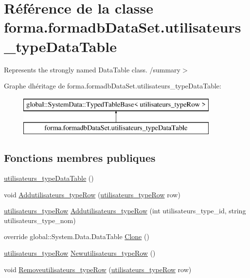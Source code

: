 \hypertarget{classforma_1_1formadb_data_set_1_1utilisateurs__type_data_table}{}\section{Référence de la classe forma.\+formadb\+Data\+Set.\+utilisateurs\+\_\+type\+Data\+Table}
\label{classforma_1_1formadb_data_set_1_1utilisateurs__type_data_table}


Represents the strongly named Data\+Table class. /summary$>$  


Graphe d\textquotesingle{}héritage de forma.\+formadb\+Data\+Set.\+utilisateurs\+\_\+type\+Data\+Table\+:\begin{figure}[H]
\begin{center}
\leavevmode
\includegraphics[height=2.000000cm]{classforma_1_1formadb_data_set_1_1utilisateurs__type_data_table}
\end{center}
\end{figure}
\subsection*{Fonctions membres publiques}
\begin{DoxyCompactItemize}
\item 
\hyperlink{classforma_1_1formadb_data_set_1_1utilisateurs__type_data_table_ab0d5fc78412d86030c82ea083c03442f}{utilisateurs\+\_\+type\+Data\+Table} ()
\item 
void \hyperlink{classforma_1_1formadb_data_set_1_1utilisateurs__type_data_table_a6b7a378e2b68a13c0cb03e1697c31ae4}{Addutilisateurs\+\_\+type\+Row} (\hyperlink{classforma_1_1formadb_data_set_1_1utilisateurs__type_row}{utilisateurs\+\_\+type\+Row} row)
\item 
\hyperlink{classforma_1_1formadb_data_set_1_1utilisateurs__type_row}{utilisateurs\+\_\+type\+Row} \hyperlink{classforma_1_1formadb_data_set_1_1utilisateurs__type_data_table_a2d37ec98a1245d1f366e803ca7d76d74}{Addutilisateurs\+\_\+type\+Row} (int utilisateurs\+\_\+type\+\_\+id, string utilisateurs\+\_\+type\+\_\+nom)
\item 
override global\+::\+System.\+Data.\+Data\+Table \hyperlink{classforma_1_1formadb_data_set_1_1utilisateurs__type_data_table_a776e34e2867b2b20acb27ddcc4f1ddb8}{Clone} ()
\item 
\hyperlink{classforma_1_1formadb_data_set_1_1utilisateurs__type_row}{utilisateurs\+\_\+type\+Row} \hyperlink{classforma_1_1formadb_data_set_1_1utilisateurs__type_data_table_af4d53c5ae04bcd1489bc8f7903cfdc0c}{Newutilisateurs\+\_\+type\+Row} ()
\item 
void \hyperlink{classforma_1_1formadb_data_set_1_1utilisateurs__type_data_table_a3c15123fdcf954aad0d3eea58214ee81}{Removeutilisateurs\+\_\+type\+Row} (\hyperlink{classforma_1_1formadb_data_set_1_1utilisateurs__type_row}{utilisateurs\+\_\+type\+Row} row)
\end{DoxyCompactItemize}
